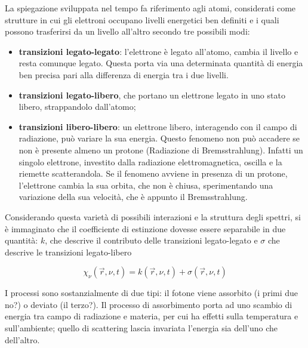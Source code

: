 
La spiegazione sviluppata nel tempo fa riferimento agli atomi, considerati come strutture in cui gli elettroni occupano livelli energetici ben definiti e i quali possono trasferirsi da un livello all'altro secondo tre possibili modi:

\begin{itemize}
  \item \textbf{transizioni legato-legato}: l'elettrone è legato all'atomo, cambia il livello e resta comunque legato. Questa porta via una determinata quantità di energia ben precisa pari alla differenza di energia tra i due livelli.
  \item \textbf{transizioni legato-libero}, che portano un elettrone legato in uno stato libero, strappandolo dall'atomo;
  \item \textbf{transizioni libero-libero}: un elettrone libero, interagendo con il campo di radiazione, può variare la sua energia. Questo fenomeno non può accadere se non è presente almeno un protone (Radiazione di Bremsstrahlung). Infatti un singolo elettrone, investito dalla radiazione elettromagnetica, oscilla e la riemette scatterandola. Se il fenomeno avviene in presenza di un protone, l'elettrone cambia la sua orbita, che non è chiusa, sperimentando una variazione della sua velocità, che è appunto il Bremsstrahlung.%
  
  
\end{itemize}

Considerando questa varietà di possibili interazioni e la struttura degli spettri, si è immaginato che il coefficiente di estinzione dovesse essere separabile in due quantità: $k$, che descrive il contributo delle transizioni legato-legato e ${\sigma}$ che descrive le transizioni legato-libero

$$\chi_\nu(\vec{r},\nu,t)=k(\vec{r},\nu,t) + \sigma(\vec{r},\nu,t)$$

I processi sono sostanzialmente di due tipi: il fotone viene assorbito (i primi due no?) o deviato (il terzo?). Il processo di assorbimento porta ad uno scambio di energia tra campo di radiazione e materia, per cui ha effetti sulla temperatura e sull'ambiente; quello di scattering lascia invariata l'energia sia dell'uno che dell'altro. %

